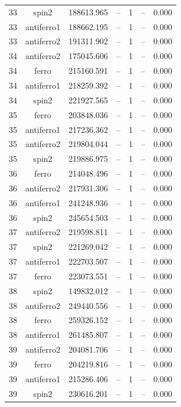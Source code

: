 \begin{longtable}{@{}ccrrrrr@{}}
33 & spin2 & 188613.965 & -- & 1 & -- & 0.000 \\
33 & antiferro1 & 188662.195 & -- & 1 & -- & 0.000 \\
33 & antiferro2 & 191311.902 & -- & 1 & -- & 0.000 \\
\rowcolor{gray!20} 34 & antiferro2 & 175045.606 & -- & 1 & -- & 0.000 \\
34 & ferro & 215160.591 & -- & 1 & -- & 0.000 \\
34 & antiferro1 & 218259.392 & -- & 1 & -- & 0.000 \\
34 & spin2 & 221927.565 & -- & 1 & -- & 0.000 \\
\rowcolor{gray!20} 35 & ferro & 203848.036 & -- & 1 & -- & 0.000 \\
35 & antiferro1 & 217236.362 & -- & 1 & -- & 0.000 \\
35 & antiferro2 & 219804.044 & -- & 1 & -- & 0.000 \\
35 & spin2 & 219886.975 & -- & 1 & -- & 0.000 \\
\rowcolor{gray!20} 36 & ferro & 214048.496 & -- & 1 & -- & 0.000 \\
36 & antiferro2 & 217931.306 & -- & 1 & -- & 0.000 \\
36 & antiferro1 & 241248.936 & -- & 1 & -- & 0.000 \\
36 & spin2 & 245654.503 & -- & 1 & -- & 0.000 \\
\rowcolor{gray!20} 37 & antiferro2 & 219598.811 & -- & 1 & -- & 0.000 \\
37 & spin2 & 221269.042 & -- & 1 & -- & 0.000 \\
37 & antiferro1 & 222703.507 & -- & 1 & -- & 0.000 \\
37 & ferro & 223073.551 & -- & 1 & -- & 0.000 \\
\rowcolor{gray!20} 38 & spin2 & 149832.012 & -- & 1 & -- & 0.000 \\
38 & antiferro2 & 249440.556 & -- & 1 & -- & 0.000 \\
38 & ferro & 259326.152 & -- & 1 & -- & 0.000 \\
38 & antiferro1 & 261485.807 & -- & 1 & -- & 0.000 \\
\rowcolor{gray!20} 39 & antiferro2 & 204081.706 & -- & 1 & -- & 0.000 \\
39 & ferro & 204219.816 & -- & 1 & -- & 0.000 \\
39 & antiferro1 & 215286.406 & -- & 1 & -- & 0.000 \\
39 & spin2 & 230616.201 & -- & 1 & -- & 0.000 \\
\end{longtable}